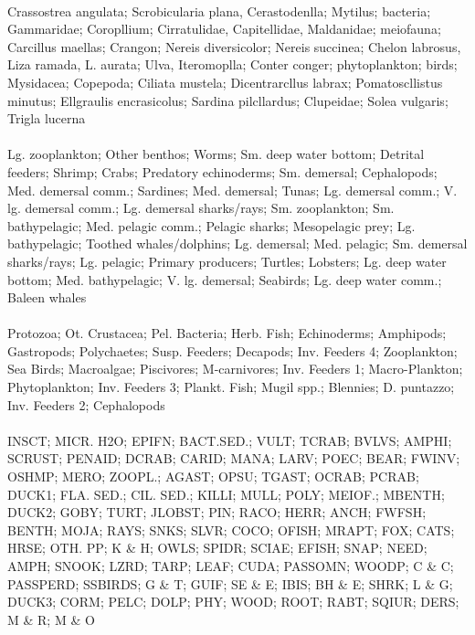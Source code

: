 \fullhline
\hline
{} \\
\hline
Crassostrea angulata; Scrobicularia plana, Cerastodenlla; Mytilus; bacteria; Gammaridae; Coropllium; Cirratulidae, Capitellidae, Maldanidae; meiofauna; Carcillus maellas; Crangon; Nereis diversicolor; Nereis succinea; Chelon labrosus, Liza ramada, L. aurata; Ulva, Iteromoplla; Conter conger; phytoplankton; birds; Mysidacea; Copepoda; Ciliata mustela; Dicentrarcllus labrax; Pomatoscllistus minutus; Ellgraulis encrasicolus; Sardina pilcllardus; Clupeidae; Solea vulgaris; Trigla lucerna\\
\fullhline
\hline
{} \\
\hline
Lg. zooplankton; Other benthos; Worms; Sm. deep water bottom; Detrital feeders; Shrimp; Crabs; Predatory echinoderms; Sm. demersal; Cephalopods; Med. demersal comm.; Sardines; Med. demersal; Tunas; Lg. demersal comm.; V. lg. demersal comm.; Lg. demersal sharks/rays; Sm. zooplankton; Sm. bathypelagic; Med. pelagic comm.; Pelagic sharks; Mesopelagic prey; Lg. bathypelagic; Toothed whales/dolphins; Lg. demersal; Med. pelagic; Sm. demersal sharks/rays; Lg. pelagic; Primary producers; Turtles; Lobsters; Lg. deep water bottom; Med. bathypelagic; V. lg. demersal; Seabirds; Lg. deep water comm.; Baleen whales\\
\fullhline
\hline
{} \\
\hline
Protozoa; Ot. Crustacea; Pel. Bacteria; Herb. Fish; Echinoderms; Amphipods; Gastropods; Polychaetes; Susp. Feeders; Decapods; Inv. Feeders 4; Zooplankton; Sea Birds; Macroalgae; Piscivores; M-carnivores; Inv. Feeders 1; Macro-Plankton; Phytoplankton; Inv. Feeders 3; Plankt. Fish; Mugil spp.; Blennies; D. puntazzo; Inv. Feeders 2; Cephalopods\\
\fullhline
\hline
{} \\
\hline
INSCT; MICR. H2O; EPIFN; BACT.SED.; VULT; TCRAB; BVLVS; AMPHI; SCRUST; PENAID; DCRAB; CARID; MANA; LARV; POEC; BEAR; FWINV; OSHMP; MERO; ZOOPL.; AGAST; OPSU; TGAST; OCRAB; PCRAB; DUCK1; FLA. SED.; CIL. SED.; KILLI; MULL; POLY; MEIOF.; MBENTH; DUCK2; GOBY; TURT; JLOBST; PIN; RACO; HERR; ANCH; FWFSH; BENTH; MOJA; RAYS; SNKS; SLVR; COCO; OFISH; MRAPT; FOX; CATS; HRSE; OTH. PP; K \& H; OWLS; SPIDR; SCIAE; EFISH; SNAP; NEED; AMPH; SNOOK; LZRD; TARP; LEAF; CUDA; PASSOMN; WOODP; C \& C; PASSPERD; SSBIRDS; G \& T; GUIF; SE \& E; IBIS; BH \& E; SHRK; L \& G; DUCK3; CORM; PELC; DOLP; PHY; WOOD; ROOT; RABT; SQIUR; DERS; M \& R; M \& O\\
